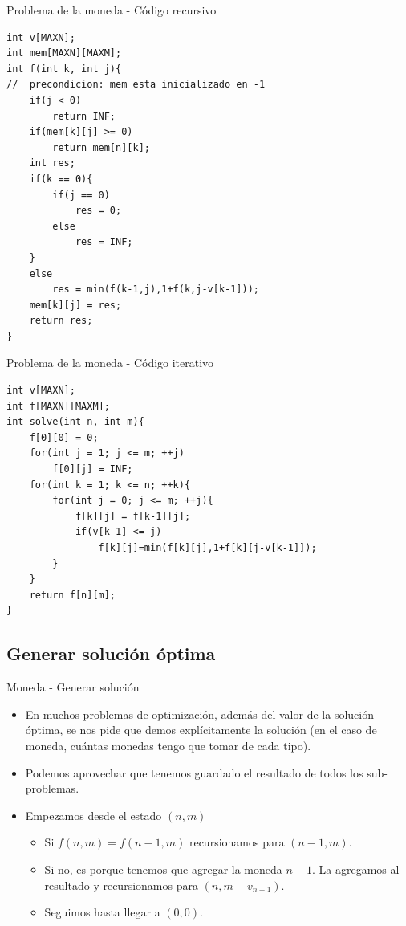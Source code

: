 \documentclass{beamer}
\begin{document}
\begin{frame}[fragile]{Problema de la moneda - C\'odigo recursivo}
\begin{lstlisting}
int v[MAXN];
int mem[MAXN][MAXM];
int f(int k, int j){
//	precondicion: mem esta inicializado en -1
	if(j < 0)
		return INF;
	if(mem[k][j] >= 0)
		return mem[n][k];
	int res;
	if(k == 0){
		if(j == 0)
	    	res = 0;
	    else
	    	res = INF;
	}
	else
		res = min(f(k-1,j),1+f(k,j-v[k-1]));
	mem[k][j] = res;
	return res;
}
\end{lstlisting}
\end{frame}

\begin{frame}[fragile]{Problema de la moneda - C\'odigo iterativo}
\begin{lstlisting}
int v[MAXN];
int f[MAXN][MAXM];
int solve(int n, int m){
	f[0][0] = 0;
	for(int j = 1; j <= m; ++j)
		f[0][j] = INF;
	for(int k = 1; k <= n; ++k){
		for(int j = 0; j <= m; ++j){
			f[k][j] = f[k-1][j];
			if(v[k-1] <= j)
				f[k][j]=min(f[k][j],1+f[k][j-v[k-1]]);
		}
	}
	return f[n][m];
}
\end{lstlisting}
\end{frame}

\subsection{Generar soluci\'on \'optima}

\begin{frame}{Moneda - Generar soluci\'on}
\begin{itemize}
\item
En muchos problemas de optimizaci\'on, adem\'as del valor de la soluci\'on \'optima, se nos pide que demos expl\'icitamente la soluci\'on (en el caso de moneda, cu\'antas monedas tengo que tomar de cada tipo).
\item
Podemos aprovechar que tenemos guardado el resultado de todos los sub-problemas.
\item
Empezamos desde el estado $(n,m)$
\begin{itemize}
\item
Si $f(n,m)=f(n-1,m)$ recursionamos para $(n-1,m)$.
\item
Si no, es porque tenemos que agregar la moneda $n-1$. La agregamos al resultado y recursionamos para $(n,m-v_{n-1})$.
\item
Seguimos hasta llegar a $(0,0)$.
\end{itemize}

\end{itemize}
\end{frame}
\end{document}
